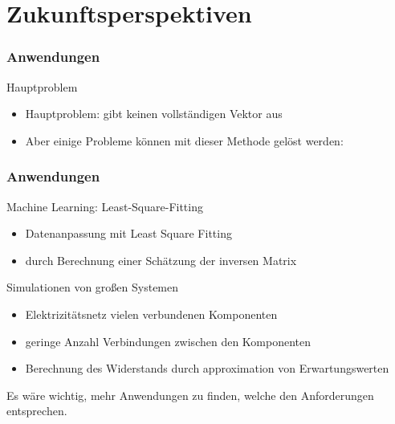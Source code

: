\section{Zukunftsperspektiven}


\begin{frame}
    \frametitle{Anwendungen}

    Hauptproblem
    \begin{itemize}
        \item Hauptproblem: gibt keinen vollständigen Vektor aus
        \item Aber einige Probleme können mit dieser Methode gelöst werden:
    \end{itemize}
    
\end{frame}

\begin{frame}
    \frametitle{Anwendungen}


    Machine Learning: Least-Square-Fitting
    \begin{itemize}
        \item Datenanpassung mit Least Square Fitting
        \item durch Berechnung einer Schätzung der inversen Matrix
    \end{itemize}

   \hfil


    Simulationen von großen Systemen 
    \begin{itemize}
        \item Elektrizitätsnetz vielen verbundenen Komponenten 
        \item geringe Anzahl Verbindungen zwischen den Komponenten
        \item Berechnung des Widerstands durch approximation von Erwartungswerten
    \end{itemize} 

   \hfil
   
    Es wäre wichtig, mehr Anwendungen zu finden, welche den Anforderungen entsprechen. 
\end{frame}

